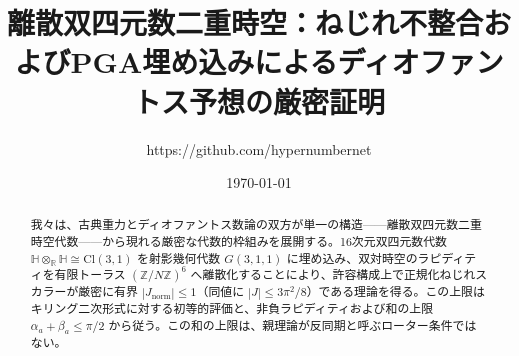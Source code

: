 \documentclass[a4paper]{article}
\title{離散双四元数二重時空：ねじれ不整合およびPGA埋め込みによるディオファントス予想の厳密証明}
\author{https://github.com/hypernumbernet}
\date{\today}
\theoremstyle{definition}
\theoremstyle{remark}
\newcommand{\Jnorm}{J_{\mathrm{norm}}}
\begin{document}
\maketitle

\begin{abstract}
我々は、古典重力とディオファントス数論の双方が単一の構造——離散双四元数二重時空代数——から現れる厳密な代数的枠組みを展開する。16次元双四元数代数 \(\mathbb{H} \otimes_{\mathbb{R}} \mathbb{H} \cong \mathrm{Cl}(3,1)\) を射影幾何代数 \(G(3,1,1)\) に埋め込み、双対時空のラピディティを有限トーラス \((\mathbb{Z}/N\mathbb{Z})^6\) へ離散化することにより、許容構成上で正規化ねじれスカラーが厳密に有界 \(|\Jnorm| \leq 1\)（同値に \(|J| \leq 3\pi^2/8\)）である理論を得る。この上限はキリング二次形式に対する初等的評価と、非負ラピディティおよび和の上限 \(\alpha_a+\beta_a\le\pi/2\) から従う。この和の上限は、親理論が反同期と呼ぶローター条件ではない。


\end{abstract}
\end{document}
